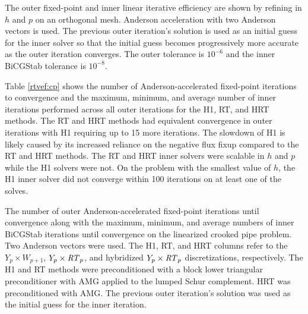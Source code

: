 \documentclass[../doc.tex]{subfiles}
\begin{document}
The outer fixed-point and inner linear iterative efficiency are shown by refining in $h$ and $p$ on an orthogonal mesh. Anderson acceleration with two Anderson vectors is used. The previous outer iteration's solution is used as an initial guess for the inner solver so that the initial guess becomes progressively more accurate as the outer iteration converges. The outer tolerance is $10^{-6}$ and the inner BiCGStab tolerance is $10^{-8}$. 

Table \ref{rtvef:cp} shows the number of Anderson-accelerated fixed-point iterations to convergence and the maximum, minimum, and average number of inner iterations performed across all outer iterations for the H1, RT, and HRT methods. The RT and HRT methods had equivalent convergence in outer iterations with H1 requiring up to 15 more iterations. The slowdown of H1 is likely caused by its increased reliance on the negative flux fixup compared to the RT and HRT methods. The RT and HRT inner solvers were scalable in $h$ and $p$ while the H1 solvers were not. On the problem with the smallest value of $h$, the H1 inner solver did not converge within 100 iterations on at least one of the solves. 
\begin{table}
\centering
\caption{The number of outer Anderson-accelerated fixed-point iterations until convergence along with the maximum, minimum, and average numbers of inner BiCGStab iterations until convergence on the linearized crooked pipe problem. Two Anderson vectors were used. The H1, RT, and HRT columns refer to the $Y_p\times W_{p+1}$, $Y_p\times \mathit{RT}_p$, and hybridized $Y_p\times \mathit{RT}_p$ discretizations, respectively. The H1 and RT methods were preconditioned with a block lower triangular preconditioner with AMG applied to the lumped Schur complement. HRT was preconditioned with AMG. The previous outer iteration's solution was used as the initial guess for the inner iteration. }
\label{rtvef:cp}
\begin{adjustbox}{max width=\textwidth}

\end{adjustbox}
\end{table}
\end{document}
